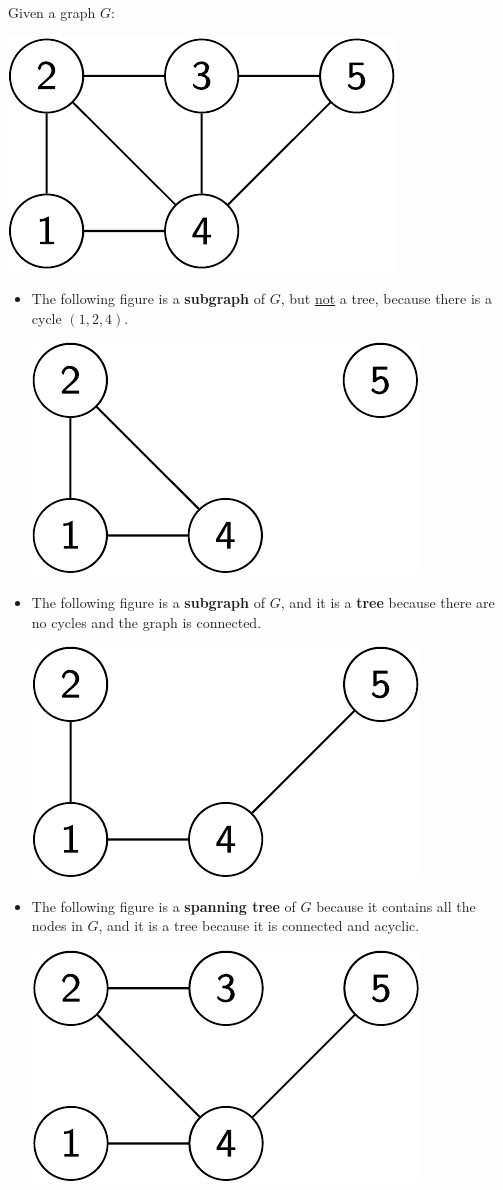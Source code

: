 \begin{examplebox}
    Given a graph $G$:
    \begin{center}
        \includegraphics[width=.3\textwidth]{img/trees-1.pdf}
    \end{center}

    \begin{itemize}
        \item The following figure is a \textbf{subgraph} of $G$, but \underline{not} a tree, because there is a cycle $\left(1,2,4\right)$.
        \begin{center}
            \includegraphics[width=.3\textwidth]{img/trees-2.pdf}
        \end{center}

        \item The following figure is a \textbf{subgraph} of $G$, and it is a \textbf{tree} because there are no cycles and the graph is connected.
        \begin{center}
            \includegraphics[width=.3\textwidth]{img/trees-3.pdf}
        \end{center}
        
        \item The following figure is a \textbf{spanning tree} of $G$ because it contains all the nodes in $G$, and it is a tree because it is connected and acyclic.
        \begin{center}
            \includegraphics[width=.3\textwidth]{img/trees-4.pdf}
        \end{center}
    \end{itemize}
\end{examplebox}